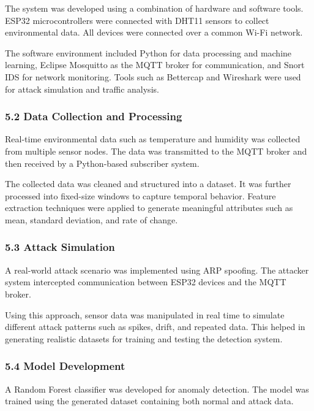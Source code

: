The system was developed using a combination of hardware and software
tools. ESP32 microcontrollers were connected with DHT11 sensors to
collect environmental data. All devices were connected over a common
Wi-Fi network.

The software environment included Python for data processing and machine
learning, Eclipse Mosquitto as the MQTT broker for communication, and
Snort IDS for network monitoring. Tools such as Bettercap and Wireshark
were used for attack simulation and traffic analysis.

\subsubsection{\texorpdfstring{\textbf{5.2 Data Collection and
Processing}}{5.2 Data Collection and Processing}}\label{data-collection-and-processing}

Real-time environmental data such as temperature and humidity was
collected from multiple sensor nodes. The data was transmitted to the
MQTT broker and then received by a Python-based subscriber system.

The collected data was cleaned and structured into a dataset. It was
further processed into fixed-size windows to capture temporal behavior.
Feature extraction techniques were applied to generate meaningful
attributes such as mean, standard deviation, and rate of change.

\subsubsection{\texorpdfstring{\textbf{5.3 Attack
Simulation}}{5.3 Attack Simulation}}\label{attack-simulation}

A real-world attack scenario was implemented using ARP spoofing. The
attacker system intercepted communication between ESP32 devices and the
MQTT broker.

Using this approach, sensor data was manipulated in real time to
simulate different attack patterns such as spikes, drift, and repeated
data. This helped in generating realistic datasets for training and
testing the detection system.

\subsubsection{\texorpdfstring{\textbf{5.4 Model
Development}}{5.4 Model Development}}\label{model-development}

A Random Forest classifier was developed for anomaly detection. The
model was trained using the generated dataset containing both normal and
attack data.

